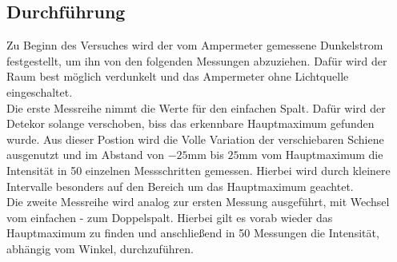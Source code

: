 \subsection{Durchführung}
Zu Beginn des Versuches wird der vom Ampermeter gemessene Dunkelstrom festgestellt, um ihn von den folgenden Messungen abzuziehen.
Dafür wird der Raum best möglich verdunkelt und das Ampermeter ohne Lichtquelle eingeschaltet.
\\ 
\newline
Die erste Messreihe nimmt die Werte für den einfachen Spalt. Dafür wird der Detekor solange verschoben, biss das erkennbare Hauptmaximum 
gefunden wurde. Aus dieser Postion wird die Volle Variation der verschiebaren Schiene ausgenutzt und im Abstand von $-25 \si{\mm}$ bis 
$25 \si{\mm}$ vom Hauptmaximum die Intensität in 50 einzelnen Messschritten gemessen. 
Hierbei wird durch kleinere Intervalle besonders auf den Bereich um das Hauptmaximum geachtet.
\\
\newline
Die zweite Messreihe wird analog zur ersten Messung ausgeführt, mit Wechsel vom einfachen - zum Doppelspalt.
Hierbei gilt es vorab wieder das Hauptmaximum zu finden und anschließend in 50 Messungen die Intensität, abhängig vom Winkel,
durchzuführen. 